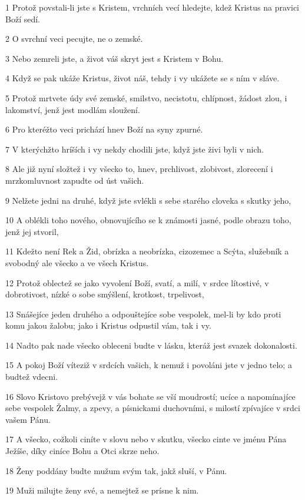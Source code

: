 \par 1 Protož povstali-li jste s Kristem, vrchních vecí hledejte, kdež Kristus na pravici Boží sedí.
\par 2 O svrchní veci pecujte, ne o zemské.
\par 3 Nebo zemreli jste, a život váš skryt jest s Kristem v Bohu.
\par 4 Když se pak ukáže Kristus, život náš, tehdy i vy ukážete se s ním v sláve.
\par 5 Protož mrtvete údy své zemské, smilstvo, necistotu, chlípnost, žádost zlou, i lakomství, jenž jest modlám sloužení.
\par 6 Pro kteréžto veci prichází hnev Boží na syny zpurné.
\par 7 V kterýchžto hríších i vy nekdy chodili jste, když jste živi byli v nich.
\par 8 Ale již nyní složtež i vy všecko to, hnev, prchlivost, zlobivost, zlorecení i mrzkomluvnost zapudte od úst vašich.
\par 9 Nelžete jedni na druhé, když jste svlékli s sebe starého cloveka s skutky jeho,
\par 10 A oblékli toho nového, obnovujícího se k známosti jasné, podle obrazu toho, jenž jej stvoril,
\par 11 Kdežto není Rek a Žid, obrízka a neobrízka, cizozemec a Scýta, služebník a svobodný ale všecko a ve všech Kristus.
\par 12 Protož oblectež se jako vyvolení Boží, svatí, a milí, v srdce lítostivé, v dobrotivost, nízké o sobe smýšlení, krotkost, trpelivost,
\par 13 Snášejíce jeden druhého a odpouštejíce sobe vespolek, mel-li by kdo proti komu jakou žalobu; jako i Kristus odpustil vám, tak i vy.
\par 14 Nadto pak nade všecko obleceni budte v lásku, kteráž jest svazek dokonalosti.
\par 15 A pokoj Boží víteziž v srdcích vašich, k nemuž i povoláni jste v jedno telo; a budtež vdecni.
\par 16 Slovo Kristovo prebývejž v vás bohate se vší moudrostí; ucíce a napomínajíce sebe vespolek Žalmy, a zpevy, a písnickami duchovními, s milostí zpívajíce v srdci vašem Pánu.
\par 17 A všecko, cožkoli ciníte v slovu nebo v skutku, všecko cinte ve jménu Pána Ježíše, díky ciníce Bohu a Otci skrze neho.
\par 18 Ženy poddány budte mužum svým tak, jakž sluší, v Pánu.
\par 19 Muži milujte ženy své, a nemejtež se prísne k nim.
